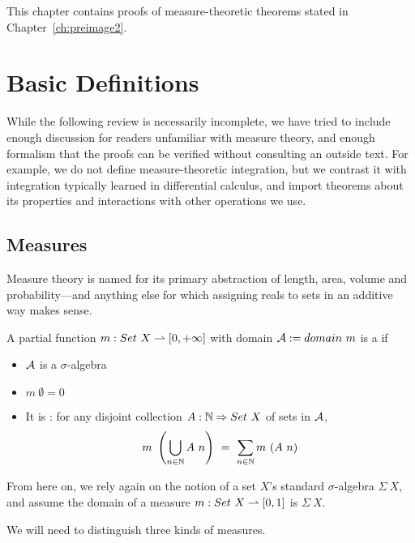 
This chapter contains proofs of measure-theoretic theorems stated in Chapter~\ref{ch:preimage2}.

\section{Basic Definitions}

While the following review is necessarily incomplete, we have tried to include enough discussion for readers unfamiliar with measure theory, and enough formalism that the proofs can be verified without consulting an outside text.
For example, we do not define measure-theoretic integration, but we contrast it with integration typically learned in differential calculus, and import theorems about its properties and interactions with other operations we use.

\subsection{Measures}

Measure theory is named for its primary abstraction of length, area, volume and probability---and anything else for which assigning reals to sets in an additive way makes sense.

\begin{definition}[measure]
\label{def:measure}
A partial function $m : Set~X \rightharpoonup [0,+\infty]$ with domain $\mathcal{A} := domain~m$ is a  if
\begin{itemize}
	\item $\mathcal{A}$ is a $\sigma$-algebra
	\item $m~\emptyset = 0$
	\item It is : for any disjoint collection $A : \mathbb{N} \Rightarrow Set~X$ of sets in $\mathcal{A}$,
	\begin{equation}
		m~\left(\bigcup_{n \in \Nat} A~n\right)\ =\ \sum_{n \in \Nat} m~(A~n)
	\end{equation}
\end{itemize}
\end{definition}

From here on, we rely again on the notion of a set $X$'s standard $\sigma$-algebra $\Sigma~X$, and assume the domain of a measure $m : Set~X \rightharpoonup [0,1]$ is $\Sigma~X$.

We will need to distinguish three kinds of measures.


